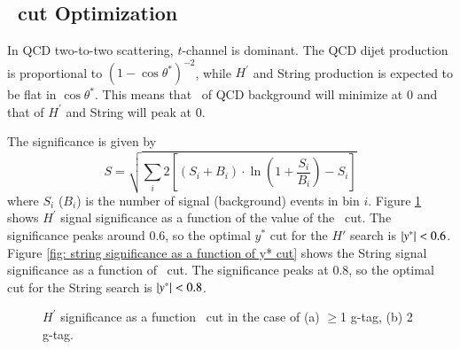 \subsection{\ystar\ cut Optimization}
\label{section:ystarCutOptimization}


In QCD two-to-two scattering, $t$-channel is dominant. The QCD dijet production is proportional to 
$\displaystyle{(1-\cos\theta^{*})^{-2}}$, while $H^\prime$ and String production is expected to be flat in 
$\cos\theta^{*}$. This means that \ystar\  of QCD background will minimize at 0 and that of $H^\prime$  
and String will peak at 0.


The significance is given by 
\begin{equation}
S  = \sqrt{\sum_{i}{2\left[ \left(S_{i}+B_{i} \right)\cdot \ln \left(1+\frac{S_{i}}{B_{i}}\right)-S_{i}\right]}}
\end{equation}
where $S_i$ ($B_i$) is the number of signal (background) events in bin $i$. 
Figure \ref{fig: hprime significance as a function of y* cut} shows $H^\prime$ signal significance as a function 
of the value of the \ystar\  cut. The significance peaks  around 0.6, so the optimal $y^{*}$ cut for the $H'$ search is 
$|y^\ast| < 0.6$. Figure \ref{fig: string significance as a function of y* cut} shows the String signal significance as a function of \ystar\ cut. The significance peaks at  0.8, so the optimal  cut for the String search is $|y^\ast| < 0.8$.

\begin{figure}[htbp]
        \centering
        \caption{$H^\prime$ significance as a function \ystar\ cut in the case of (a) $\geq$1 g-tag, (b) 2 g-tag.}
        \label{fig: hprime significance as a function of y* cut}
\end{figure}


